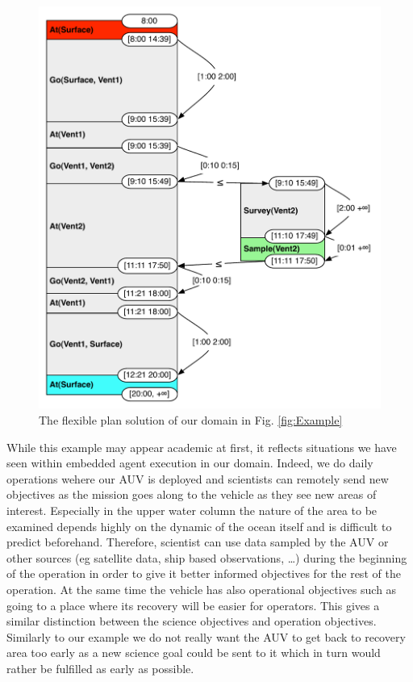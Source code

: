 \begin{figure}[!htb]
  \centering
  \includegraphics[width=0.8\columnwidth]{figs/example_plan}
  \caption{The flexible plan solution of our domain in
    Fig. \ref{fig:Example}}
  \label{fig:ex:plan}
\end{figure}

While this example may appear academic at first, it reflects situations
we have seen within embedded agent execution in our domain. Indeed, we
do daily operations wehere our AUV is deployed and scientists can
remotely send new objectives as the mission goes along to the vehicle
as they see new areas of interest. Especially in the upper water
column the nature of the area to be examined depends highly on the
dynamic of the ocean itself and is difficult to predict beforehand. Therefore,
scientist can use data sampled by the AUV or other sources (eg
satellite data, ship based observations, \dots{}) during the beginning of
the operation in order to give it better informed objectives for the
rest of the operation. At the same time the vehicle has
also operational objectives such as going to a place where its
recovery will be easier for operators. This gives a similar
distinction between the science objectives and operation
objectives. Similarly to our example we do not really want the
AUV to get back to recovery area too early as a new science goal could
be sent to it which in turn would rather be fulfilled as early as
possible.

